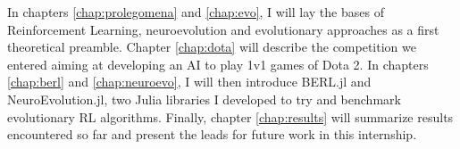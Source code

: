 In chapters \ref{chap:prolegomena} and \ref{chap:evo}, I will lay the bases of Reinforcement Learning, neuroevolution and evolutionary approaches as a first theoretical preamble. Chapter \ref{chap:dota} will describe the competition we entered aiming at developing an AI to play 1v1 games of Dota 2. In chapters \ref{chap:berl} and \ref{chap:neuroevo}, I will then introduce BERL.jl and NeuroEvolution.jl, two Julia libraries I developed to try and benchmark evolutionary RL algorithms. 
Finally, chapter \ref{chap:results} will summarize results encountered so far and present the leads for future work in this internship.


